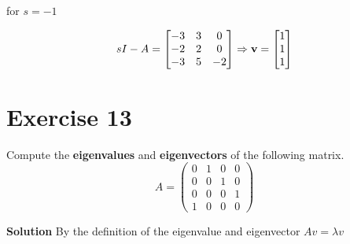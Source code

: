 \documentclass[12pt,a4paper]{article}
\begin{document}
for $ s=-1$

\begin{align*}
	sI - A = \begin{bmatrix}
		-3 & 3 & 0 \\
		-2 & 2 & 0 \\
		-3 & 5 & -2
	\end{bmatrix} \Rightarrow {\bf v} = \begin{bmatrix}
		1\\1\\1
	\end{bmatrix}
\end{align*}



\par\nopagebreak\vspace{3cm}

\Needspace{9cm}
\section*{Exercise 13}
Compute the \textbf{eigenvalues} and \textbf{eigenvectors} of the following matrix.
\[
A=\begin{pmatrix}
0 & 1 & 0 & 0\\
0 & 0 & 1 & 0\\
0 & 0 & 0 & 1\\
1 & 0 & 0 & 0
\end{pmatrix}
\]

\textbf{Solution}
 By the definition of the eigenvalue and eigenvector $Av = \lambda v$
\end{document}
